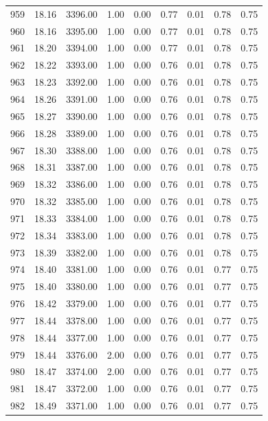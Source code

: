 \documentclass{article}\usepackage[]{graphicx}\usepackage[]{color}
\begin{document}
\begin{longtable}{rrrrrrrrr}
  959 & 18.16 & 3396.00 & 1.00 & 0.00 & 0.77 & 0.01 & 0.78 & 0.75 \\ 
  960 & 18.16 & 3395.00 & 1.00 & 0.00 & 0.77 & 0.01 & 0.78 & 0.75 \\ 
  961 & 18.20 & 3394.00 & 1.00 & 0.00 & 0.77 & 0.01 & 0.78 & 0.75 \\ 
  962 & 18.22 & 3393.00 & 1.00 & 0.00 & 0.76 & 0.01 & 0.78 & 0.75 \\ 
  963 & 18.23 & 3392.00 & 1.00 & 0.00 & 0.76 & 0.01 & 0.78 & 0.75 \\ 
  964 & 18.26 & 3391.00 & 1.00 & 0.00 & 0.76 & 0.01 & 0.78 & 0.75 \\ 
  965 & 18.27 & 3390.00 & 1.00 & 0.00 & 0.76 & 0.01 & 0.78 & 0.75 \\ 
  966 & 18.28 & 3389.00 & 1.00 & 0.00 & 0.76 & 0.01 & 0.78 & 0.75 \\ 
  967 & 18.30 & 3388.00 & 1.00 & 0.00 & 0.76 & 0.01 & 0.78 & 0.75 \\ 
  968 & 18.31 & 3387.00 & 1.00 & 0.00 & 0.76 & 0.01 & 0.78 & 0.75 \\ 
  969 & 18.32 & 3386.00 & 1.00 & 0.00 & 0.76 & 0.01 & 0.78 & 0.75 \\ 
  970 & 18.32 & 3385.00 & 1.00 & 0.00 & 0.76 & 0.01 & 0.78 & 0.75 \\ 
  971 & 18.33 & 3384.00 & 1.00 & 0.00 & 0.76 & 0.01 & 0.78 & 0.75 \\ 
  972 & 18.34 & 3383.00 & 1.00 & 0.00 & 0.76 & 0.01 & 0.78 & 0.75 \\ 
  973 & 18.39 & 3382.00 & 1.00 & 0.00 & 0.76 & 0.01 & 0.78 & 0.75 \\ 
  974 & 18.40 & 3381.00 & 1.00 & 0.00 & 0.76 & 0.01 & 0.77 & 0.75 \\ 
  975 & 18.40 & 3380.00 & 1.00 & 0.00 & 0.76 & 0.01 & 0.77 & 0.75 \\ 
  976 & 18.42 & 3379.00 & 1.00 & 0.00 & 0.76 & 0.01 & 0.77 & 0.75 \\ 
  977 & 18.44 & 3378.00 & 1.00 & 0.00 & 0.76 & 0.01 & 0.77 & 0.75 \\ 
  978 & 18.44 & 3377.00 & 1.00 & 0.00 & 0.76 & 0.01 & 0.77 & 0.75 \\ 
  979 & 18.44 & 3376.00 & 2.00 & 0.00 & 0.76 & 0.01 & 0.77 & 0.75 \\ 
  980 & 18.47 & 3374.00 & 2.00 & 0.00 & 0.76 & 0.01 & 0.77 & 0.75 \\ 
  981 & 18.47 & 3372.00 & 1.00 & 0.00 & 0.76 & 0.01 & 0.77 & 0.75 \\ 
  982 & 18.49 & 3371.00 & 1.00 & 0.00 & 0.76 & 0.01 & 0.77 & 0.75 \\ 

\end{longtable}
\end{document}

